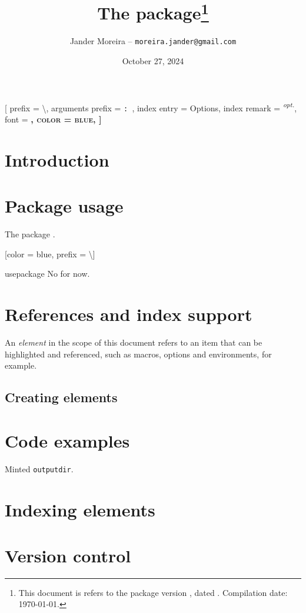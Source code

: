 \documentclass[11pt, outputdir = ./out]{article}
\title{The \PackageName{docs} package\footnote{This document is refers to the package version \DocsVersion, dated \DocsDate. Compilation date: \today.}}
\author{Jander Moreira -- \texttt{moreira.jander@gmail.com}}
\date{October 27, 2024}
\begin{document}
\maketitle
\tableofcontents

[
    prefix = \textbackslash,
    arguments prefix = \texttt{: },
    index entry = Options,
    index remark = { \textsuperscript{\textit{opt.}}},
    font = \scshape\bfseries,
    color = blue,
]

\section{Introduction}


\section{Package usage}
The package .

[color = blue, prefix = \textbackslash]
\begin{Package*}{usepackage}{}{}
    No  for now.
\end{Package*}

\section{References and index support}

An \textit{element} in the scope of this document refers to an item that can be highlighted and referenced, such as macros, options and environments, for example.

\subsection{Creating elements}

\section{Code examples}

Minted \texttt{outputdir}.

\section{Indexing elements}

\section{Version control}

\printindex
\end{document}
